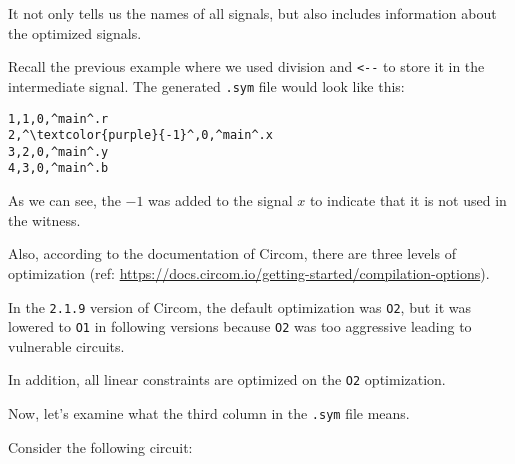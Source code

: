 \documentclass[../lecture-notes-105x135.tex]{subfiles}
\begin{document}
    It not only tells us the names of all signals, but also includes information about the optimized signals.

    Recall the previous example where we used division and \texttt{<-{-}} to store it in the intermediate signal.
    The generated \texttt{.sym} file would look like this:

    \begin{center}
        \begin{tcolorbox}[enhanced,
            width=0.5\textwidth,
            title=\textbf{.sym file for $b \;\texttt{<-{-}}\; x/y, r \;\texttt{<==}\; by$},
            coltitle=gray!25!black,
            attach boxed title to top center={yshift=-2mm,yshifttext=-1mm},
            boxed title style={size=small,colframe=gray!75!black,
            colback=blue!30!white,boxrule=1pt},
            top=-0.35cm,
            bottom=-0.35cm]
            \begin{lstlisting}[language=Circom,numbers=none,basicstyle=\ttfamily\footnotesize,escapechar=^]
1,1,0,^main^.r
2,^\textcolor{purple}{-1}^,0,^main^.x
3,2,0,^main^.y
4,3,0,^main^.b
            \end{lstlisting}
        \end{tcolorbox}
    \end{center}

    As we can see, the $-1$ was added to the signal $x$ to indicate that it is not used in the witness.

    Also, according to the documentation of Circom, there are three levels of optimization (ref: \url{https://docs.circom.io/getting-started/compilation-options}).

    In the \texttt{2.1.9} version of Circom, the default optimization was \texttt{O2}, but it was lowered to \texttt{O1} in following versions because \texttt{O2} was too aggressive leading to vulnerable circuits.

    \begin{remark}
        In addition, all linear constraints are optimized on the \texttt{O2} optimization.
    \end{remark}

    Now, let's examine what the third column in the \texttt{.sym} file means.

    Consider the following circuit:
\end{document}

